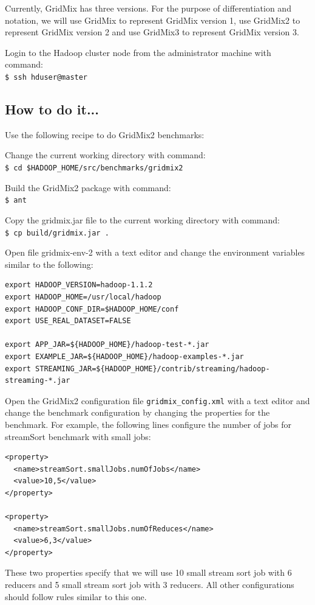 Currently, GridMix has three versions. For the purpose of differentiation and notation, we will use GridMix to represent GridMix version 1, use GridMix2 to represent GridMix version 2 and use GridMix3 to represent GridMix version 3.

Login to the Hadoop cluster node from the administrator machine with command:\\
\verb|$ ssh hduser@master|
\subsection*{How to do it...}
Use the following recipe to do GridMix2 benchmarks:

Change the current working directory with command: \\
\verb|$ cd $HADOOP_HOME/src/benchmarks/gridmix2|

Build the GridMix2 package with command: \\
\verb|$ ant|

Copy the gridmix.jar file to the current working directory with command: \\
\verb|$ cp build/gridmix.jar .|

Open file gridmix-env-2 with a text editor and change the environment variables similar to the following:
\lstset{style=bashstyle}
\begin{lstlisting}
export HADOOP_VERSION=hadoop-1.1.2
export HADOOP_HOME=/usr/local/hadoop
export HADOOP_CONF_DIR=$HADOOP_HOME/conf
export USE_REAL_DATASET=FALSE

export APP_JAR=${HADOOP_HOME}/hadoop-test-*.jar
export EXAMPLE_JAR=${HADOOP_HOME}/hadoop-examples-*.jar
export STREAMING_JAR=${HADOOP_HOME}/contrib/streaming/hadoop-streaming-*.jar
\end{lstlisting}

Open the GridMix2 configuration file \verb|gridmix_config.xml| with a text editor and change the benchmark configuration by changing the properties for the benchmark. For example, the following lines configure the number of jobs for streamSort benchmark with small jobs:
\lstset{style=bashstyle}
\begin{lstlisting}
<property>
  <name>streamSort.smallJobs.numOfJobs</name>
  <value>10,5</value>
</property>

<property>
  <name>streamSort.smallJobs.numOfReduces</name>
  <value>6,3</value>
</property>
\end{lstlisting}
These two properties specify that we will use 10 small stream sort job with 6 reducers and 5 small stream sort job with 3 reducers. All other configurations should follow rules similar to this one.

